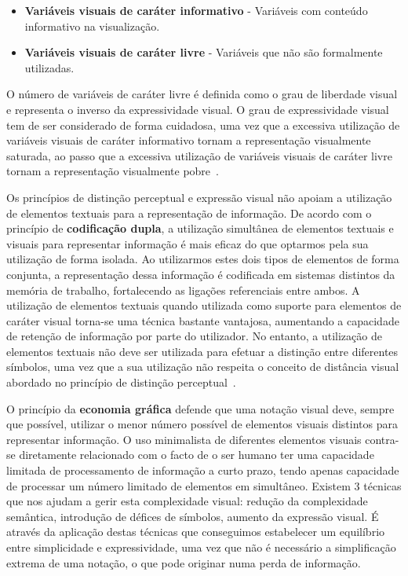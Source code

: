 \begin{itemize}
  \item \textbf{Variáveis visuais de caráter informativo} - Variáveis com conteúdo informativo na visualização.
  \item \textbf{Variáveis visuais de caráter livre} - Variáveis que não são formalmente utilizadas.
\end{itemize}

O número de variáveis de caráter livre é definida como o grau de liberdade visual e representa o inverso da expressividade visual. O grau de expressividade visual tem de ser considerado de forma cuidadosa, uma vez que a excessiva utilização de variáveis visuais de caráter informativo tornam a representação visualmente saturada, ao passo que a excessiva utilização de variáveis visuais de caráter livre tornam a representação visualmente pobre~\cite{moody2009physics}.

Os princípios de distinção perceptual e expressão visual não apoiam a utilização de elementos textuais para a representação de informação. De acordo com o princípio de \textbf{codificação dupla}, a utilização simultânea de elementos textuais e visuais para representar informação é mais eficaz do que optarmos pela sua utilização de forma isolada. Ao utilizarmos estes dois tipos de elementos de forma conjunta, a representação dessa informação é codificada em sistemas distintos da memória de trabalho, fortalecendo as ligações referenciais entre ambos. A utilização de elementos textuais quando utilizada como suporte para elementos de caráter visual torna-se uma técnica bastante vantajosa, aumentando a capacidade de retenção de informação por parte do utilizador. No entanto, a utilização de elementos textuais não deve ser utilizada para efetuar a distinção entre diferentes símbolos, uma vez que a sua utilização não respeita o conceito de distância visual abordado no princípio de distinção perceptual~\cite{moody2009physics}. 

O princípio da \textbf{economia gráfica} defende que uma notação visual deve, sempre que possível, utilizar o menor número possível de elementos visuais distintos para representar informação. O uso minimalista de diferentes elementos visuais contra-se diretamente relacionado com o facto de o ser humano ter uma capacidade limitada de processamento de informação a curto prazo, tendo apenas capacidade de processar um número limitado de elementos em simultâneo. Existem 3 técnicas que nos ajudam a gerir esta complexidade visual: redução da complexidade semântica, introdução de défices de símbolos, aumento da expressão visual. É através da aplicação destas técnicas que conseguimos estabelecer um equilíbrio entre simplicidade e expressividade, uma vez que não é necessário a simplificação extrema de uma notação, o que pode originar numa perda de informação.

